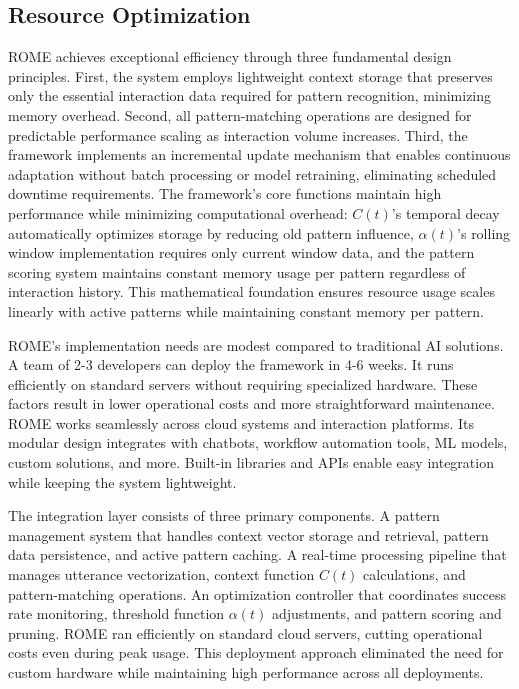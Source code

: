 \documentclass[12pt]{article}
\begin{document}
\subsection{Resource Optimization}
ROME achieves exceptional efficiency through three fundamental design principles. First, the system employs lightweight context storage that preserves only the essential interaction data required for pattern recognition, minimizing memory overhead. Second, all pattern-matching operations are designed for predictable performance scaling as interaction volume increases. Third, the framework implements an incremental update mechanism that enables continuous adaptation without batch processing or model retraining, eliminating scheduled downtime requirements. The framework's core functions maintain high performance while minimizing computational overhead: $C(t)$'s temporal decay automatically optimizes storage by reducing old pattern influence, $\alpha(t)$'s rolling window implementation requires only current window data, and the pattern scoring system maintains constant memory usage per pattern regardless of interaction history. This mathematical foundation ensures resource usage scales linearly with active patterns while maintaining constant memory per pattern.

ROME's implementation needs are modest compared to traditional AI solutions. A team of 2-3 developers can deploy the framework in 4-6 weeks. It runs efficiently on standard servers without requiring specialized hardware. These factors result in lower operational costs and more straightforward maintenance. ROME works seamlessly across cloud systems and interaction platforms. Its modular design integrates with chatbots, workflow automation tools, ML models, custom solutions, and more. Built-in libraries and APIs enable easy integration while keeping the system lightweight.

The integration layer consists of three primary components. A pattern management system that handles context vector storage and retrieval, pattern data persistence, and active pattern caching. A real-time processing pipeline that manages utterance vectorization, context function $C(t)$ calculations, and pattern-matching operations. An optimization controller that coordinates success rate monitoring, threshold function $\alpha(t)$ adjustments, and pattern scoring and pruning. ROME ran efficiently on standard cloud servers, cutting operational costs even during peak usage. This deployment approach eliminated the need for custom hardware while maintaining high performance across all deployments.
\end{document}
